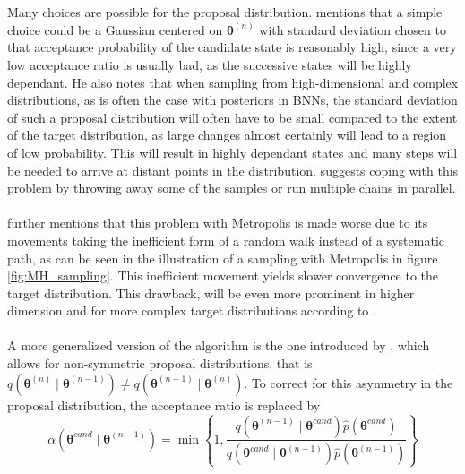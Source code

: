 \\
\\
Many choices are possible for the proposal distribution. \cite{neal2012bayesian} mentions that a simple choice could be a Gaussian centered on $\boldsymbol{\theta}^{(n)}$ with standard deviation chosen to that acceptance probability of the candidate state is reasonably high, since a very low acceptance ratio is usually bad, as the successive states will be highly dependant. He also notes that when sampling from high-dimensional and complex distributions, as is often the case with posteriors in BNNs, the standard deviation of such a proposal distribution will often have to be small compared to the extent of the target distribution, as large changes almost certainly will lead to a region of low probability. This will result in highly dependant states and many steps will be needed to arrive at distant points in the distribution. \cite{gelmanbda04} suggests coping with this problem by throwing away some of the samples or run multiple chains in parallel. \\
\\
\cite{neal2012bayesian} further mentions that this problem with Metropolis is made worse due to its movements taking the inefficient form of a random walk instead of a systematic path, as can be seen in the illustration of a sampling with Metropolis in figure \ref{fig:MH_sampling}. This inefficient movement yields slower convergence to the target distribution. This drawback, will be even more prominent in higher dimension and for more complex target distributions according to \cite{gelmanbda04}. \\
\\
A more generalized version of the algorithm is the one introduced by \cite{hastings70}, which allows for non-symmetric proposal distributions, that is $q(\boldsymbol{\theta}^{(n)}\mid \boldsymbol{\theta}^{(n-1)}) \neq q(\boldsymbol{\theta}^{(n-1)}\mid \boldsymbol{\theta}^{(n)})$. To correct for this asymmetry in the proposal distribution, the acceptance ratio is replaced by
\begin{equation}\label{eq: hasti_pasti}
\alpha\left(\boldsymbol{\theta}^{c a n d} \mid \boldsymbol{\theta}^{(n-1)}\right)=\min \left\{1, \frac{q\left(\boldsymbol{\theta}^{(n-1)} \mid \boldsymbol{\theta}^{c a n d}\right) \hat{p}\left(\boldsymbol{\theta}^{c a n d}\right)}{q\left(\boldsymbol{\theta}^{c a n d} \mid \boldsymbol{\theta}^{(n-1)}\right) \hat{p}\left(\boldsymbol{\theta}^{(n-1)}\right)}\right\} 
\end{equation}
